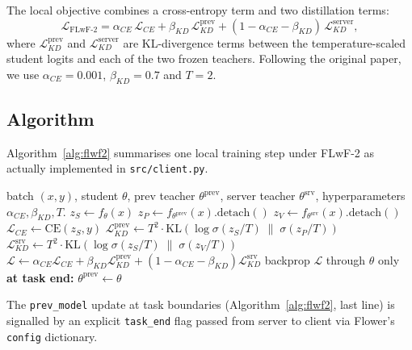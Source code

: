 \documentclass[journal]{IEEEtran}
\begin{document}
\noindent
The local objective combines a cross-entropy term and two distillation
terms:
\begin{equation}
\boxed{\;
\mathcal{L}_{\mathrm{FLwF\text{-}2}}
   = \alpha_{CE}\,\mathcal{L}_{CE}
   + \beta_{KD}\,\mathcal{L}_{KD}^{\text{prev}}
   + (1\!-\!\alpha_{CE}\!-\!\beta_{KD})\,
     \mathcal{L}_{KD}^{\text{server}},
\;}
\label{eq:flwf2-loss}
\end{equation}
where $\mathcal{L}_{KD}^{\text{prev}}$ and
$\mathcal{L}_{KD}^{\text{server}}$ are KL-divergence terms between the
temperature-scaled student logits and each of the two frozen teachers.
Following the original paper, we use $\alpha_{CE}{=}0.001$,
$\beta_{KD}{=}0.7$ and $T{=}2$.

\subsection{Algorithm}

Algorithm~\ref{alg:flwf2} summarises one local training step under
FLwF-2 as actually implemented in \texttt{src/client.py}.

\begin{algorithm}[t]
\caption{FLwF-2 local training (one batch).}
\label{alg:flwf2}
\begin{algorithmic}[1]
\REQUIRE batch $(x,y)$, student $\theta$, prev teacher $\theta^{\text{prev}}$, server teacher $\theta^{\text{srv}}$, hyperparameters $\alpha_{CE},\beta_{KD},T$.
\STATE $z_S \leftarrow f_\theta(x)$ 
\STATE $z_P \leftarrow f_{\theta^{\text{prev}}}(x).\mathrm{detach}()$
\STATE $z_V \leftarrow f_{\theta^{\text{srv}}}(x).\mathrm{detach}()$
\STATE $\mathcal{L}_{CE} \leftarrow \mathrm{CE}(z_S, y)$
\STATE $\mathcal{L}_{KD}^{\text{prev}} \leftarrow T^2 \cdot \mathrm{KL}\!\left(\log\sigma(z_S/T)\;\|\;\sigma(z_P/T)\right)$
\STATE $\mathcal{L}_{KD}^{\text{srv}}  \leftarrow T^2 \cdot \mathrm{KL}\!\left(\log\sigma(z_S/T)\;\|\;\sigma(z_V/T)\right)$
\STATE $\mathcal{L} \leftarrow \alpha_{CE}\mathcal{L}_{CE} + \beta_{KD}\mathcal{L}_{KD}^{\text{prev}} + (1{-}\alpha_{CE}{-}\beta_{KD})\mathcal{L}_{KD}^{\text{srv}}$
\STATE backprop $\mathcal{L}$ through $\theta$ only
\STATE \textbf{at task end:} $\theta^{\text{prev}} \leftarrow \theta$
\end{algorithmic}
\end{algorithm}

The \texttt{prev\_model} update at task boundaries (Algorithm~\ref{alg:flwf2},
last line) is signalled by an explicit \texttt{task\_end} flag passed
from server to client via Flower's \texttt{config} dictionary.
\end{document}
